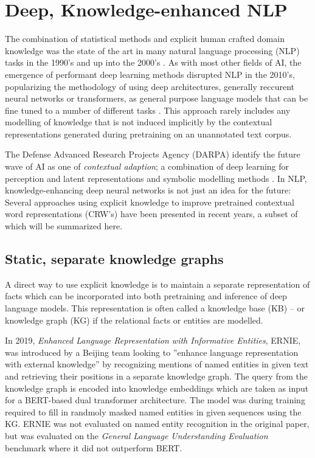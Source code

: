 \documentclass[main.tex]{subfiles}
\begin{document}
\section{Deep, Knowledge-enhanced NLP}
The combination of statistical methods and explicit human crafted domain knowledge was the state of the art in many natural language processing (NLP) tasks in the 1990's and up into the 2000's \cite[Sec. 22.5]{russell2016ai}.
As with most other fields of AI, the emergence of performant deep learning methods disrupted NLP in the 2010's, popularizing the methodology of using deep architectures, generally reccurent neural networks or transformers, as general purpose language models that can be fine tuned to a number of different tasks \cite{otter18dlnlp}.
This approach rarely includes any modelling of knowledge that is not induced implicitly by the contextual representations generated during pretraining on an unannotated text corpus.

The Defense Advanced Research Projects Agency (DARPA) identify the future wave of AI as one of \emph{contextual adaption}; a combination of deep learning for perception and latent representations and symbolic modelling methods \cite{darpa17ai}.
In NLP, knowledge-enhancing deep neural networks is not just an idea for the future:
Several approaches using explicit knowledge to improve pretrained contextual word representations (CRW's) have been presented in recent years, a subset of which will be summarized here.

\subsection{Static, separate knowledge graphs}
A direct way to use explicit knowledge is to maintain a separate representation of facts which can be incorporated into both pretraining and inference of deep language models.
This representation is often called a knowledge base (KB)  -- or knowledge graph (KG) if the relational facts or entities are modelled.

In 2019, \emph{Enhanced Language Representation with Informative Entities}, ERNIE, was introduced by a Beijing team \cite{zhang2019ernie} looking to ''enhance language representation  with  external  knowledge'' \cite[1]{zhang2019ernie} by recognizing mentions of named entities in given text and retrieving their positions in a separate knowledge graph.
The query from the knowledge graph is encoded into knowledge embeddings which are taken as input for a BERT-based dual transformer architecture.
The model was during training required to fill in randmoly masked named entities in given sequences using the KG.
ERNIE was not evaluated on named entity recognition in the original paper, but was evaluated on the \emph{General Language Understanding Evaluation} benchmark \cite{wang2018glue} where it did not outperform BERT.
\end{document}
